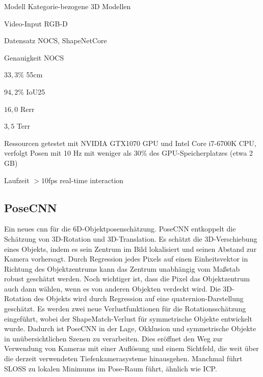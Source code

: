 \documentclass[a4paper, 11pt]{article}
\begin{document}
\begin{multicols*}{2}
    \begin{description*}
        \item[Modell] Kategorie-bezogene 3D Modellen
        \item[Video-Input] RGB-D
        \item[Datensatz] \Gls{NOCS}, \Gls{ShapeNetCore}
        \item[Genauigkeit] \Gls{NOCS}
        \begin{itemize*}
            \item $33,3\%$ \Gls{55cm}
            \item $94,2\%$ \Gls{IoU25}
            \item $16,0$ \Gls{Rerr}
            \item $3,5$ \Gls{Terr}
        \end{itemize*}
        \item[Ressourcen] getestet mit NVIDIA GTX1070 GPU und Intel Core i7-6700K CPU, verfolgt Posen mit 10 Hz mit weniger als 30\% des GPU-Speicherplatzes (etwa 2 GB)
        \item[Laufzeit] $>10$fps real-time interaction
    \end{description*}

    \subsection{PoseCNN}
    Ein neues \Gls{cnn} für die 6D-Objektposenschätzung. PoseCNN\cite{PoseCNN} entkoppelt die Schätzung von 3D-Rotation und 3D-Translation. Es schätzt die 3D-Verschiebung eines Objekts, indem es sein Zentrum im Bild lokalisiert und seinen Abstand zur Kamera vorhersagt. Durch Regression jedes Pixels auf einen Einheitsvektor in Richtung des Objektzentrums kann das Zentrum unabhängig vom Maßstab robust geschätzt werden. Noch wichtiger ist, dass die Pixel das Objektzentrum auch dann wählen, wenn es von anderen Objekten verdeckt wird.
    Die 3D-Rotation des Objekts wird durch Regression auf eine \Gls{quaternion}-Darstellung  geschätzt. Es werden zwei neue Verlustfunktionen für die Rotationsschätzung eingeführt, wobei der ShapeMatch-Verlust für symmetrische Objekte entwickelt wurde.
    Dadurch ist PoseCNN in der Lage, Okklusion und symmetrische Objekte in unübersichtlichen Szenen zu verarbeiten. Dies eröffnet den Weg zur Verwendung von Kameras mit einer Auflösung und einem Sichtfeld, die weit über die derzeit verwendeten Tiefenkamerasysteme hinausgehen.
    Manchmal führt SLOSS zu lokalen Minimums im Pose-Raum führt, ähnlich wie ICP\cite{ICP}.


\end{multicols*}
\end{document}
